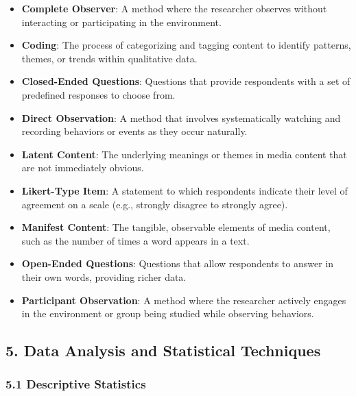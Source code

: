 \documentclass[
]{book}
\providecommand{\tightlist}{%
  \setlength{\itemsep}{0pt}\setlength{\parskip}{0pt}}
\begin{document}
\begin{itemize}
\tightlist
\item
  \textbf{Complete Observer}: A method where the researcher observes without interacting or participating in the environment.
\item
  \textbf{Coding}: The process of categorizing and tagging content to identify patterns, themes, or trends within qualitative data.
\item
  \textbf{Closed-Ended Questions}: Questions that provide respondents with a set of predefined responses to choose from.
\item
  \textbf{Direct Observation}: A method that involves systematically watching and recording behaviors or events as they occur naturally.
\item
  \textbf{Latent Content}: The underlying meanings or themes in media content that are not immediately obvious.
\item
  \textbf{Likert-Type Item}: A statement to which respondents indicate their level of agreement on a scale (e.g., strongly disagree to strongly agree).
\item
  \textbf{Manifest Content}: The tangible, observable elements of media content, such as the number of times a word appears in a text.
\item
  \textbf{Open-Ended Questions}: Questions that allow respondents to answer in their own words, providing richer data.
\item
  \textbf{Participant Observation}: A method where the researcher actively engages in the environment or group being studied while observing behaviors.
\end{itemize}

\subsection*{\texorpdfstring{5. \textbf{Data Analysis and Statistical Techniques}}{5. Data Analysis and Statistical Techniques}}\label{data-analysis-and-statistical-techniques}

\subsubsection*{\texorpdfstring{\textbf{5.1 Descriptive Statistics}}{5.1 Descriptive Statistics}}\label{descriptive-statistics}
\end{document}
